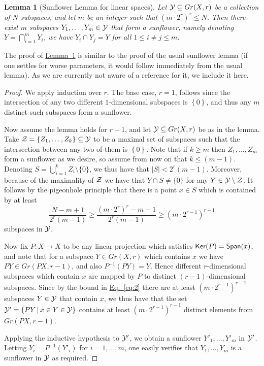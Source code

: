 \documentclass[11pt]{article}
\numberwithin{equation}{section}
\newtheorem{lemma}[theorem]{Lemma}
\theoremstyle{definition}
\theoremstyle{plain}
\newcommand{\Z}{\mathbb Z}
\newcommand{\expref}[2]{\hyperref[#2]{#1~\ref{#2}}}
\newcommand{\expeqref}[2]{\hyperref[#2]{#1~\eqref{#2}}}
\newcommand\card[1]{\left| {#1} \right|}
\newcommand\set[1]{{\left\{ #1 \right\}}}
\newcommand\Set[2]{ \left\{ #1 \,  \vert  \, #2\right\} }
\newcommand\spn{{\sf Span}}
\renewcommand\geq{\geqslant}
\renewcommand\leq{\leqslant}
\renewcommand\le{\leqslant}
\newcommand{\parenth}[1]{\left({#1}\right)}
\begin{document}
\def\Y{{\cal Y}}
\def\Z{{\cal Z}}
\begin{lemma}[Sunflower Lemma for linear spaces]\label{lemma:sunflower}
  Let $\Y\subseteq Gr(X,r)$ be a collection of $N$ subspaces, and
  let $m$ be
  an integer such that $(m \cdot 2^r)^r \leq N$. Then there exist $m$
  subspaces  $Y_1, \ldots, Y_m\in\Y$ that form a sunflower,
  namely denoting %
  $Y = \bigcap_{i=1}^m Y_i$, %
  we have $Y_i \cap Y_j = Y$ for
  all $1\le i\neq j\le m$. %
\end{lemma}
The proof of \expref{Lemma}{lemma:sunflower} is similar to the proof of the
usual sunflower lemma (if one settles for worse parameters, it would
follow immediately from the usual lemma). As we are currently not aware of a reference
for it, we include it here.
\begin{proof}
  We apply induction over $r$. The base case, $r=1$, follows since the
  intersection of any two different $1$-dimensional %
  subspaces %
  is
  $\set{0}$, and thus any  $m$ distinct such subspaces form a
  sunflower.

Now assume the lemma holds for $r-1$, and let $\Y\subseteq Gr(X,r)$ be
as in the lemma. Take $\Z=\set{Z_1,\ldots,Z_k}\subseteq\Y$ to be a maximal set of
subspaces such that the intersection between any two of them is
$\set{0}$. Note that if $k\geq m$ then $Z_1,\ldots,Z_m$ form a
sunflower as we desire, so assume from now on that $k\leq (m-1)$. Denoting
%
$S=\bigcup_{i=1}^kZ_i\setminus \{0\}$,  %
we thus have that $\card S < 2^r(m-1)$. Moreover, because of the maximality of $\Z$
we have that
%
$Y\cap S\neq \{0\}$
for any $Y\in\Y\setminus\Z$. It follows by
%
the pigeonhole principle
that there
is a point $x\in S$ which is contained by at least
\begin{equation}\label{eq:2}
\frac{N-m+1}{2^r(m-1)}\geq  \frac{(m\cdot 2^r)^r-m+1}{2^r(m-1)} \geq \parenth{m\cdot2^{r-1}}^{r-1}
\end{equation}
subspaces in $\Y$.

Now fix $P:X\to X$ to be any linear projection which satisfies
${\sf Ker}(P)=\spn(x)$, and note that for a subspace $Y\in Gr(X,r)$ which contains $x$ we have
$PY\in Gr(PX,r-1)$, and also
$P^{-1}(PY)=Y$. Hence different $r$-dimensional subspaces which contain $x$ are mapped
by $P$ to distinct $(r-1)$-dimensional subspaces. Since by the
bound in \expeqref{Eq.}{eq:2} there are at least
$\parenth{m\cdot2^{r-1}}^{r-1}$ subspaces $Y\in \Y$ that contain $x$,
we thus have that the set $\Y'=\Set{PY}{x\in Y\in \Y}$ contains at
least $\parenth{m\cdot2^{r-1}}^{r-1}$ distinct elements from $Gr(PX,r-1)$.

Applying the inductive hypothesis to $\Y'$, we obtain a sunflower
$Y'_1,\ldots,Y'_m$ in $\Y'$. Letting $Y_i=P^{-1}(Y'_i)$ for
$i=1,\ldots,m$, one easily verifies that $Y_1,\ldots,Y_m$ is a
sunflower in $\Y$ as required.
\end{proof}
\end{document}
